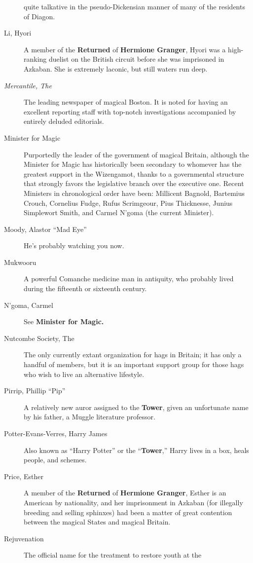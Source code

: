 \begin{description}
quite talkative in the pseudo-Dickensian manner of many of the residents
of Diagon.
\item[Li, Hyori]
A member of the \textbf{Returned} of \textbf{Hermione Granger}, Hyori
was a high-ranking duelist on the British circuit before she was
imprisoned in Azkaban. She is extremely laconic, but still waters run
deep.
\item[\emph{Mercantile, The}]
The leading newspaper of magical Boston. It is noted for having an
excellent reporting staff with top-notch investigations accompanied by
entirely deluded editorials.
\item[Minister for Magic]
Purportedly the leader of the government of magical Britain, although
the Minister for Magic has historically been secondary to whomever has
the greatest support in the Wizengamot, thanks to a governmental
structure that strongly favors the legislative branch over the executive
one. Recent Ministers in chronological order have been: Millicent
Bagnold, Bartemius Crouch, Cornelius Fudge, Rufus Scrimgeour, Pius
Thicknesse, Junius Simplewort Smith, and Carmel N'goma (the current
Minister).
\item[Moody, Alastor ``Mad Eye'']
He's probably watching you now.
\item[Mukwooru]
A powerful Comanche medicine man in antiquity, who probably lived during
the fifteenth or sixteenth century.
\item[N'goma, Carmel]
See \textbf{Minister for Magic.}
\item[Nutcombe Society, The]
The only currently extant organization for hags in Britain; it has only
a handful of members, but it is an important support group for those
hags who wish to live an alternative lifestyle.
\item[Pirrip, Phillip ``Pip'']
A relatively new auror assigned to the \textbf{Tower}, given an
unfortunate name by his father, a Muggle literature professor.
\item[Potter-Evans-Verres, Harry James]
Also known as ``Harry Potter'' or the ``\textbf{Tower},'' Harry lives in
a box, heals people, and schemes.
\item[Price, Esther]
A member of the \textbf{Returned} of \textbf{Hermione Granger}, Esther
is an American by nationality, and her imprisonment in Azkaban (for
illegally breeding and selling sphinxes) had been a matter of great
contention between the magical States and magical Britain.
\item[Rejuvenation]
The official name for the treatment to restore youth at the

\end{description}
